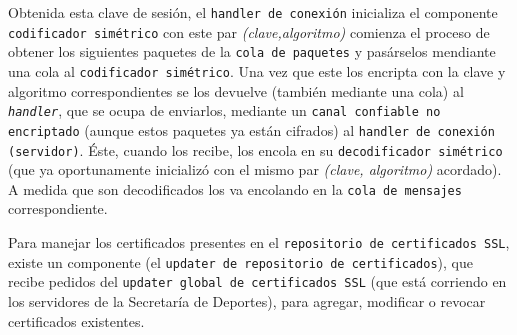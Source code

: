 Obtenida esta clave de sesión, el \texttt{handler de conexión} inicializa el componente \texttt{codificador simétrico} con este par \emph{(clave,algoritmo)} comienza el proceso de obtener los siguientes paquetes de la \texttt{cola de paquetes} y pasárselos mendiante una cola al \texttt{codificador simétrico}. Una vez que este los encripta con la clave y algoritmo correspondientes se los devuelve (también mediante una cola) al \texttt{\emph{handler}}, que se ocupa de enviarlos, mediante un \texttt{canal confiable no encriptado} (aunque estos paquetes ya están cifrados) al \texttt{handler de conexión (servidor)}. Éste, cuando los recibe, los encola en su \texttt{decodificador simétrico} (que ya oportunamente inicializó con el mismo par \emph{(clave, algoritmo)} acordado). A medida que son decodificados los va encolando en la \texttt{cola de mensajes} correspondiente.


Para manejar los certificados presentes en el \texttt{repositorio de certificados SSL}, existe un componente (el \texttt{updater de repositorio de certificados}), que recibe pedidos del \texttt{updater global de certificados SSL} (que está corriendo en los servidores de la Secretaría de Deportes), para agregar, modificar o revocar certificados existentes. 
